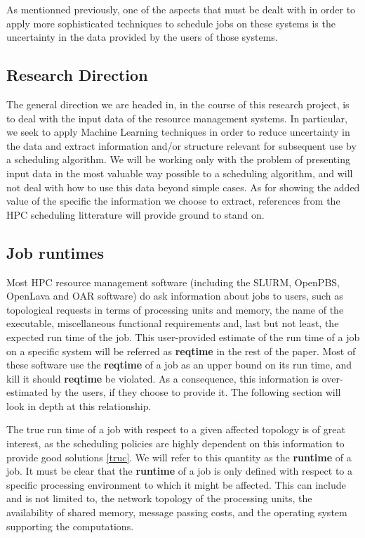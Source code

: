 \documentclass{article}
\begin{document}
As mentionned previously, one of the aspects that must be dealt with in order to apply more sophisticated techniques to schedule jobs on these systems is the uncertainty in the data provided by the users of those systems.

\subsection{Research Direction}
The general direction we are headed in, in the course of this research project, is to deal with the input data of the resource management systems.
In particular, we seek to apply Machine Learning techniques in order to reduce uncertainty in the data and extract information and/or structure relevant for subsequent use by a scheduling algorithm. We will be working only with the problem of presenting input data in the most valuable way possible to a scheduling algorithm, and will not deal with how to use this data beyond simple cases. As for showing the added value of the specific the information we choose to extract, references from the HPC scheduling litterature will provide ground to stand on.

\subsection{Job runtimes}
Most HPC resource management software (including the SLURM, OpenPBS, OpenLava and OAR software) do ask information about jobs to users, such as topological requests in terms of processing units and memory, the name of the executable, miscellaneous functional requirements and, last but not least, the expected run time of the job. This user-provided estimate of the run time of a job on a specific system will be referred as \textbf{reqtime} in the rest of the paper. Most of these software use the \textbf{reqtime} of a job as an upper bound on its run time, and kill it should \textbf{reqtime} be violated. As a consequence, this information is over-estimated by the users, if they choose to provide it. The following section will look in depth at this relationship.

The true run time of a job with respect to a given affected topology is of great interest, as the scheduling policies are highly dependent on this information to provide good solutions \ref{truc}. We will refer to this quantity as the \textbf{runtime} of a job.
It must be clear that the \textbf{runtime} of a job is only defined with respect to a specific processing environment to which it might be affected.
This can include and is not limited to, the network topology of the processing units, the availability of shared memory, message passing costs, and the operating system supporting the computations.
\end{document}
